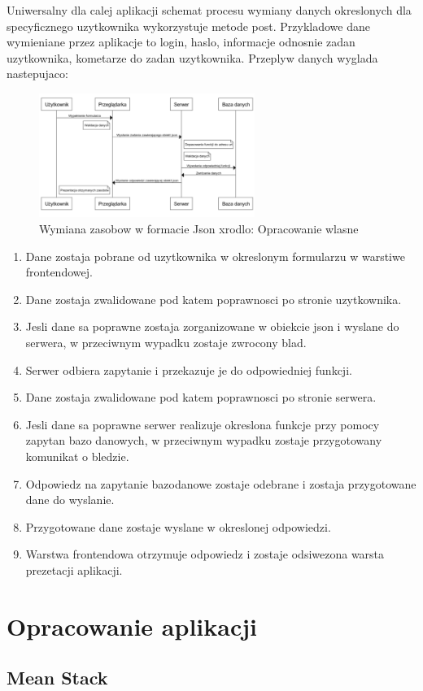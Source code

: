 \documentclass[12pt]{report}
\begin{document}
 Uniwersalny dla calej aplikacji schemat procesu wymiany danych okreslonych dla specyficznego uzytkownika wykorzystuje metode post. Przykladowe dane wymieniane przez aplikacje to login, haslo, informacje odnosnie zadan uzytkownika, kometarze do zadan uzytkownika. Przeplyw danych wyglada nastepujaco:
 \begin{figure}[!t]
\centering
\includegraphics[width=7cm]{U-P-S-B.png} 
\caption{Wymiana zasobow w formacie Json xrodlo: Opracowanie wlasne}
\end{figure}
\begin{enumerate}
\item Dane zostaja pobrane od uzytkownika w okreslonym formularzu w warstiwe frontendowej.
\item Dane zostaja zwalidowane pod katem poprawnosci po stronie uzytkownika.
\item Jesli dane sa poprawne zostaja zorganizowane w obiekcie json i wyslane do serwera, w przeciwnym wypadku zostaje zwrocony blad.
\item Serwer odbiera zapytanie i przekazuje je do odpowiedniej funkcji.
\item Dane zostaja zwalidowane pod katem poprawnosci po stronie serwera.
\item Jesli dane sa poprawne serwer realizuje okreslona funkcje przy pomocy zapytan bazo danowych, w przeciwnym wypadku zostaje przygotowany komunikat o bledzie.
\item Odpowiedz na zapytanie bazodanowe zostaje odebrane i zostaja przygotowane dane do wyslanie.
\item Przygotowane dane zostaje wyslane w okreslonej odpowiedzi.
\item Warstwa frontendowa otrzymuje odpowiedz i zostaje odsiwezona warsta prezetacji aplikacji.
\end{enumerate}
 

\chapter{Opracowanie aplikacji} \label{rozdz.4}

\section{Mean Stack}
\end{document}
